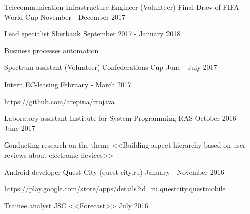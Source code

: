\begin{cventries}
\cventrynodescription
{Telecommunication Infrastructure Engineer (Volunteer)} %
{Final Draw of FIFA World Cup} %
{} %
{November - December 2017} %
	
	
\cventry
{Lead specialist} %
{Sberbank} %
{} %
{September 2017 - January 2018} %
{ 
	\begin{cvitems}
		\item {Business processes automation}
	\end{cvitems}
}
	
\cventrynodescription
{Spectrum assistant (Volunteer)} %
{Confederations Cup} %
{} %
{June - July 2017} %


\cventry
{Intern} %
{EC-leasing} %
{} %
{February - March 2017} %
{ 
	\begin{cvitems}
		\item {https://github.com/arepina/rtojava}
	\end{cvitems}
}



\cventry
{Laboratory assistant} %
{Institute for System Programming RAS} %
{} %
{October 2016 - June 2017} %
{ 
	\begin{cvitems}
		\item {Сonducting research on the theme <<Building aspect hierarchy based on user reviews about electronic devices>>}
	\end{cvitems}
}


\cventry
{Android developer} %
{Quest City (quest-city.ru)} %
{} %
{January - November 2016} %
{ %
  \begin{cvitems}
\item {https://play.google.com/store/apps/details?id=ru.questcity.questmobile}
 \end{cvitems}
}


\cventrynodescription
{Trainee analyst } %
{JSC <<Forecast>>} %
{} %
{July 2016} %




\end{cventries}
